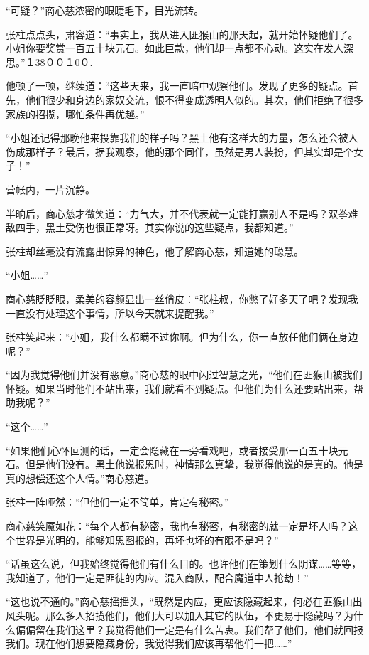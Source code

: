 
\begin{this_body}

“可疑？”商心慈浓密的眼睫毛下，目光流转。

张柱点点头，肃容道：“事实上，我从进入匪猴山的那天起，就开始怀疑他们了。小姐你要奖赏一百五十块元石。如此巨款，他们却一点都不心动。这实在发人深思。”１38００１0０.

他顿了一顿，继续道：“这些天来，我一直暗中观察他们。发现了更多的疑点。首先，他们很少和身边的家奴交流，恨不得变成透明人似的。其次，他们拒绝了很多家族的招揽，哪怕条件再优越。”

“小姐还记得那晚他来投靠我们的样子吗？黑土他有这样大的力量，怎么还会被人伤成那样子？最后，据我观察，他的那个同伴，虽然是男人装扮，但其实却是个女子！”

营帐内，一片沉静。

半晌后，商心慈才微笑道：“力气大，并不代表就一定能打赢别人不是吗？双拳难敌四手，黑土受伤也很正常呀。其实你说的这些疑点，我都知道。”

张柱却丝毫没有流露出惊异的神色，他了解商心慈，知道她的聪慧。

“小姐……”

商心慈眨眨眼，柔美的容颜显出一丝俏皮：“张柱叔，你憋了好多天了吧？发现我一直没有处理这个事情，所以今天就来提醒我。”

张柱笑起来：“小姐，我什么都瞒不过你啊。但为什么，你一直放任他们俩在身边呢？”

“因为我觉得他们并没有恶意。”商心慈的眼中闪过智慧之光，“他们在匪猴山被我们怀疑。如果当时他们不站出来，我们就看不到疑点。但他们为什么还要站出来，帮助我呢？”

“这个……”

“如果他们心怀叵测的话，一定会隐藏在一旁看戏吧，或者接受那一百五十块元石。但是他们没有。黑土他说报恩时，神情那么真挚，我觉得他说的是真的。他是真的想偿还这个人情。”商心慈道。

张柱一阵哑然：“但他们一定不简单，肯定有秘密。”

商心慈笑魇如花：“每个人都有秘密，我也有秘密，有秘密的就一定是坏人吗？这个世界是光明的，能够知恩图报的，再坏也坏的有限不是吗？”

“话虽这么说，但我始终觉得他们有什么目的。也许他们在策划什么阴谋……等等，我知道了，他们一定是匪徒的内应。混入商队，配合魔道中人抢劫！”

“这也说不通的。”商心慈摇摇头，“既然是内应，更应该隐藏起来，何必在匪猴山出风头呢。那么多人招揽他们，他们大可以加入其它的队伍，不更易于隐藏吗？为什么偏偏留在我们这里？我觉得他们一定是有什么苦衷。我们帮了他们，他们就回报我们。现在他们想要隐藏身份，我觉得我们应该再帮他们一把……”


\end{this_body}
